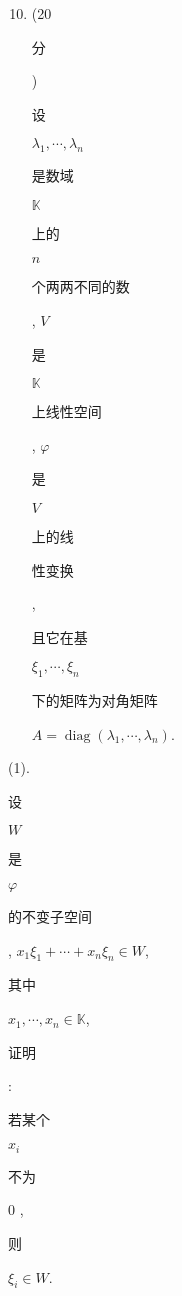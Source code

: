 \documentclass[10pt]{article}
\begin{document}
\begin{enumerate}
  \setcounter{enumi}{9}
  \item (20 \begin{CJK}{UTF8}{mj}分\end{CJK}) \begin{CJK}{UTF8}{mj}设\end{CJK} $\lambda_{1}, \cdots, \lambda_{n}$ \begin{CJK}{UTF8}{mj}是数域\end{CJK} $\mathbb{K}$ \begin{CJK}{UTF8}{mj}上的\end{CJK} $n$ \begin{CJK}{UTF8}{mj}个两两不同的数\end{CJK}, $V$ \begin{CJK}{UTF8}{mj}是\end{CJK} $\mathbb{K}$ \begin{CJK}{UTF8}{mj}上线性空间\end{CJK}, $\varphi$ \begin{CJK}{UTF8}{mj}是\end{CJK} $V$ \begin{CJK}{UTF8}{mj}上的线\end{CJK} \begin{CJK}{UTF8}{mj}性变换\end{CJK}, \begin{CJK}{UTF8}{mj}且它在基\end{CJK} $\xi_{1}, \cdots, \xi_{n}$ \begin{CJK}{UTF8}{mj}下的矩阵为对角矩阵\end{CJK} $A=\operatorname{diag}\left(\lambda_{1}, \cdots, \lambda_{n}\right)$.
\end{enumerate}
(1). \begin{CJK}{UTF8}{mj}设\end{CJK} $W$ \begin{CJK}{UTF8}{mj}是\end{CJK} $\varphi$ \begin{CJK}{UTF8}{mj}的不变子空间\end{CJK}, $x_{1} \xi_{1}+\cdots+x_{n} \xi_{n} \in W$, \begin{CJK}{UTF8}{mj}其中\end{CJK} $x_{1}, \cdots, x_{n} \in \mathbb{K}$, \begin{CJK}{UTF8}{mj}证明\end{CJK}: \begin{CJK}{UTF8}{mj}若某个\end{CJK} $x_{i}$ \begin{CJK}{UTF8}{mj}不为\end{CJK} 0 , \begin{CJK}{UTF8}{mj}则\end{CJK} $\xi_{i} \in W$.
\end{document}
